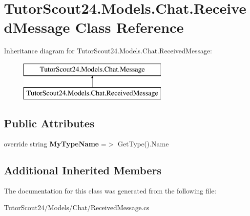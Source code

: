 \hypertarget{class_tutor_scout24_1_1_models_1_1_chat_1_1_received_message}{}\section{Tutor\+Scout24.\+Models.\+Chat.\+Received\+Message Class Reference}
\label{class_tutor_scout24_1_1_models_1_1_chat_1_1_received_message}
Inheritance diagram for Tutor\+Scout24.\+Models.\+Chat.\+Received\+Message\+:\begin{figure}[H]
\begin{center}
\leavevmode
\includegraphics[height=2.000000cm]{class_tutor_scout24_1_1_models_1_1_chat_1_1_received_message}
\end{center}
\end{figure}
\subsection*{Public Attributes}
\begin{DoxyCompactItemize}
\item 
\mbox{\label{class_tutor_scout24_1_1_models_1_1_chat_1_1_received_message_aa7e881be78223f06fb370a0c012b969c}} 
override string {\bfseries My\+Type\+Name} =$>$ Get\+Type().Name
\end{DoxyCompactItemize}
\subsection*{Additional Inherited Members}


The documentation for this class was generated from the following file\+:\begin{DoxyCompactItemize}
\item 
Tutor\+Scout24/\+Models/\+Chat/Received\+Message.\+cs\end{DoxyCompactItemize}
